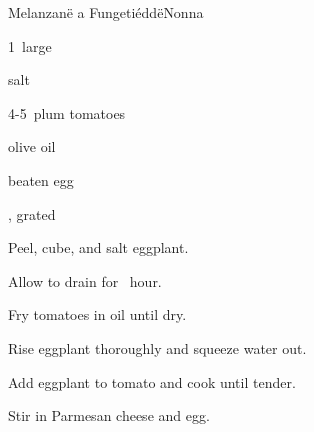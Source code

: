 \begin{recipe}{Melanzan\"e a Fungeti\'edd\"e}{Nonna}{}

\begin{ingredients}
\item 1~large 
\item salt
\item 4-5~plum tomatoes
\item olive oil
\item beaten egg
\item {}, grated
\end{ingredients}

\begin{directions}
\item Peel, cube, and salt eggplant.
\item Allow to drain for \half~hour.
\item Fry tomatoes in oil until dry.
\item Rise eggplant thoroughly and squeeze water out.
\item Add eggplant to tomato and cook until tender.
\item Stir in Parmesan cheese and egg.
\end{directions}

\end{recipe}
